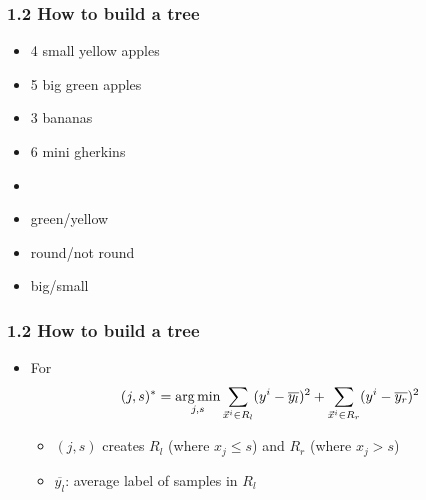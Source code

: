 \begin{frame}[t]
  \frametitle{1.2 How to build a tree}
  \begin{minipage}[h]{0.5\linewidth}
    \begin{itemize}
      \setlength{\itemsep}{0pt}
      \setlength{\parskip}{0pt}
      \setlength{\parsep}{0pt}
      \footnotesize
    \item 4 small yellow apples
    \item 5 big green apples
    \item 3 bananas
    \item 6 mini gherkins
    \end{itemize}    
  \end{minipage}%
  \begin{minipage}[h]{0.5\linewidth}
    \begin{itemize}
      \setlength{\itemsep}{0pt}
      \setlength{\parskip}{0pt}
      \setlength{\parsep}{0pt}
      \footnotesize
    \item[]  
    \item green/yellow
    \item round/not round
    \item big/small
    \end{itemize}    
  \end{minipage}%
\end{frame}

\begin{frame}[t]
  \frametitle{1.2 How to build a tree}
  \begin{itemize}
  \item For  %
    \begin{equation*}
      (j,s)^{\ast} = \operatorname*{arg\,min}_{j,s}\sum_{\vec{x}^i \in R_l} (y^i-\overline{y_l})^2 + \sum_{\vec{x}^i \in R_r}(y^i-\overline{y_r})^2
    \end{equation*}
    \begin{itemize}
      \setlength{\itemsep}{3pt}      
    \item $(j, s)$ creates  $R_l$ (where $x_j \leq s$) and $R_r$ (where $x_j > s$)
    \item $\overline{y_l}$: average label of samples in $R_l$ 
    \end{itemize}
  \end{itemize}
\end{frame}

